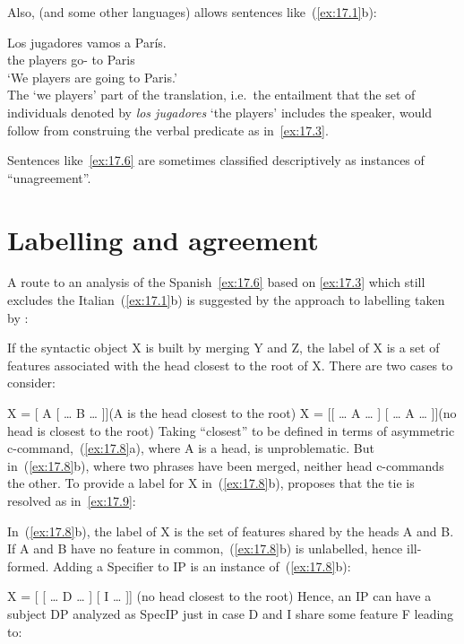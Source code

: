 \documentclass[output=paper]{langsci/langscibook}
\begin{document}
Also,  (and some other languages) allows sentences
like~(\ref{ex:17.1}b):

\ea\label{ex:17.6}
    \gll    Los jugadores vamos a París.\\
            the players      go-\Fpl{} to Paris\\
    \glt    ‘We players are going to Paris.’\\
\z
The ‘we players’ part of the translation, i.e.\ the entailment that the set of
individuals denoted by \emph{los jugadores} ‘the players’ includes the speaker,
would follow from construing the verbal predicate as in~\eqref{ex:17.3}.

Sentences like~\eqref{ex:17.6} are sometimes classified descriptively as
instances of “un\-agreement”.

\section{Labelling and agreement}\label{sec:17.2}

A route to an analysis of the Spanish~\eqref{ex:17.6} based on \eqref{ex:17.3} which still
excludes the Italian~(\ref{ex:17.1}b) is suggested by the approach to labelling
taken by \citet{Chomsky2013}:

\ea\label{ex:17.7}
    If the syntactic object X is built by merging Y and Z, the label of X is a set
    of features associated with the head closest to the root of X.
\z
There are two cases to consider:

\ea\label{ex:17.8}
    \ea X = [ A [ \dots{} B \dots{} ]]\hfill(A is the head closest to the root)
    \ex X = [[ \dots{} A \dots{} ] [ \dots{} A \dots{} ]]\hfill(no head is closest to the root)
    \z
\z
Taking “closest” to be defined in terms of asymmetric
c-command,~(\ref{ex:17.8}a), where A is a head, is unproblematic. But
in~(\ref{ex:17.8}b), where two phrases have been merged, neither head
c-commands the other. To provide a label for X in~(\ref{ex:17.8}b),
\textcite{Chomsky2013} proposes that the tie is resolved as
in~\eqref{ex:17.9}:

\ea\label{ex:17.9}
    \ea In~(\ref{ex:17.8}b), the label of X is the set of features shared by the
    heads A and B.
    \ex If A and B have no feature in common,~(\ref{ex:17.8}b) is unlabelled,
    hence ill-formed.
    \z
\z
Adding a Specifier to IP is an instance of~(\ref{ex:17.8}b):

\ea\label{ex:17.10}
    X = [ [ \dots{} D \dots{} ] [ I \dots{} ]] (no head closest to the root)
\z
Hence, an IP can have a subject DP analyzed as SpecIP just in case D and I
share some feature F leading to:
\end{document}
